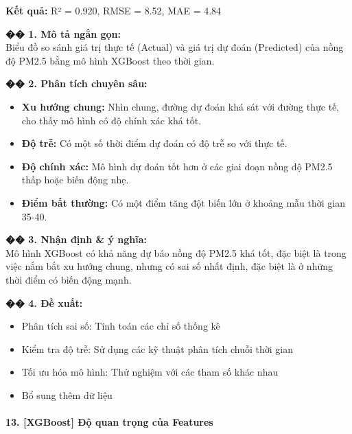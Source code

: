\documentclass[12pt,a4paper]{article}
\begin{document}
\begin{aibox}
\textbf{Kết quả:} R² = 0.920, RMSE = 8.52, MAE = 4.84

\textbf{�� 1. Mô tả ngắn gọn:}\\
Biểu đồ so sánh giá trị thực tế (Actual) và giá trị dự đoán (Predicted) của nồng độ PM2.5 bằng mô hình XGBoost theo thời gian.

\textbf{�� 2. Phân tích chuyên sâu:}
\begin{itemize}
    \item \textbf{Xu hướng chung:} Nhìn chung, đường dự đoán khá sát với đường thực tế, cho thấy mô hình có độ chính xác khá tốt.
    \item \textbf{Độ trễ:} Có một số thời điểm dự đoán có độ trễ so với thực tế.
    \item \textbf{Độ chính xác:} Mô hình dự đoán tốt hơn ở các giai đoạn nồng độ PM2.5 thấp hoặc biến động nhẹ.
    \item \textbf{Điểm bất thường:} Có một điểm tăng đột biến lớn ở khoảng mẫu thời gian 35-40.
\end{itemize}

\textbf{�� 3. Nhận định \& ý nghĩa:}\\
Mô hình XGBoost có khả năng dự báo nồng độ PM2.5 khá tốt, đặc biệt là trong việc nắm bắt xu hướng chung, nhưng có sai số nhất định, đặc biệt là ở những thời điểm có biến động mạnh.

\textbf{�� 4. Đề xuất:}
\begin{itemize}
    \item Phân tích sai số: Tính toán các chỉ số thống kê
    \item Kiểm tra độ trễ: Sử dụng các kỹ thuật phân tích chuỗi thời gian
    \item Tối ưu hóa mô hình: Thử nghiệm với các tham số khác nhau
    \item Bổ sung thêm dữ liệu
\end{itemize}
\end{aibox}

\paragraph{13. [XGBoost] Độ quan trọng của Features}
\end{document}
